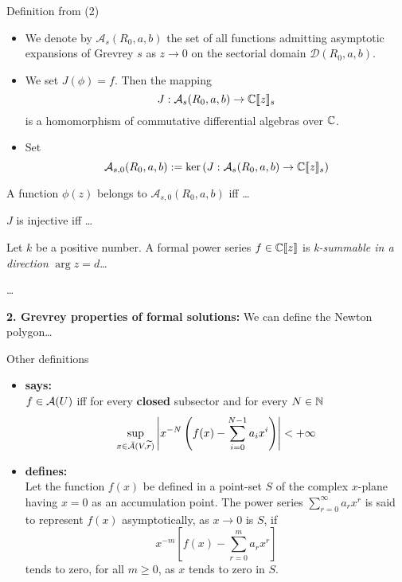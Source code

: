 {  \begin{frame}[t]{Definition from \cite{zbMATH00060600} (2)}
    \begin{itemize}
      \item We denote by $\mathcal{A}_s(R_0,a,b)$ the set of all functions
      admitting asymptotic expansions of Grevrey $s$ as $z\to 0$ on the
      sectorial domain $\mathcal{D}(R_0,a,b)$.
      \item We set $J(\phi)=f$. Then the mapping
      \[
      J: \mathcal{A}_s(R_0,a,b) \to \mathbb{C}\llbracket z\rrbracket_s
      \]
      is a homomorphism of commutative differential algebras over $\mathbb{C}$.
      \item Set
      \[
      \mathcal{A}_{s,0}(R_0,a,b):=
      \ker\left(J: \mathcal{A}_s(R_0,a,b) \to \mathbb{C}\llbracket z\rrbracket_s\right)
      \]
    \end{itemize}
    \begin{lem}[1.3]
      A function $\phi(z)$ belongs to $\mathcal{A}_{s,0}(R_0,a,b)$ iff \dots
    \end{lem}
    \begin{cor}[1.4]
      $J$ is injective iff \dots
    \end{cor}
    \begin{defn}[1.5]
      Let $k$ be a positive number. A formal power series $f\in\mathbb{C}\llbracket
      z\rrbracket$ is \emph{k-summable in a direction} $\arg z=d$\dots
    \end{defn}

    \dots

    \textbf{2. Grevrey properties of formal solutions:} We can define the
    Newton polygon\dots
  \end{frame}

  \begin{frame}[t]{Other definitions}
    \begin{itemize}
      \item \textbf{\cite[2]{majima1984asymptotic} says:}
        \\$f\in\mathcal{A}(U)$ iff for every \textbf{closed} subsector and for every
        $N\in\mathbb{N}$
        \[
          \sup_{x\in\bar{\mathcal{A}}(V,\widetilde r)}
            \left|x^{-N}\left(f(x)-\sum_{i=0}^{N-1}a_ix^i\right)\right|
          <+\infty
        \]
      \item \textbf{\cite{wasow2002asymptotic} defines:}
        \\Let the function $f(x)$ be defined in a point-set $S$ of the complex
        $x$-plane having $x=0$ as an accumulation point. The power series
        $\sum_{r=0}^\infty a_rx^r$ is said to represent $f(x)$ asymptotically,
        as $x\to0$ is $S$, if
        \[
          x^{-m}\left[f(x)-\sum_{r=0}^ma_rx^r\right]
        \]
        tends to zero, for all $m\geq0$, as $x$ tends to zero in $S$.
    \end{itemize}
  \end{frame}
}

